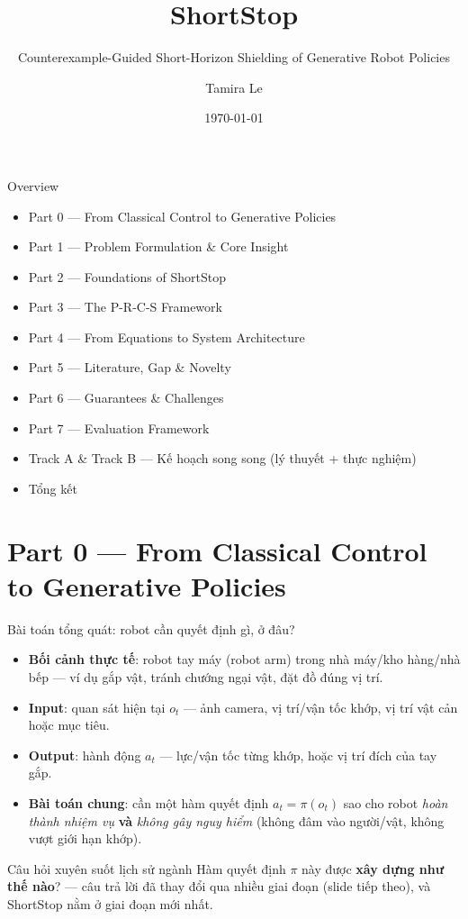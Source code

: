 \documentclass[aspectratio=169]{beamer}
\title{ShortStop}
\subtitle{Counterexample-Guided Short-Horizon Shielding of Generative Robot Policies}
\author{Tamira Le}
\date{\today}
\begin{document}
\maketitle

\begin{frame}[t,shrink=8]{Overview}
\begin{itemize}
    \item Part 0 --- From Classical Control to Generative Policies
    \item Part 1 --- Problem Formulation \& Core Insight
    \item Part 2 --- Foundations of ShortStop
    \item Part 3 --- The P-R-C-S Framework
    \item Part 4 --- From Equations to System Architecture
    \item Part 5 --- Literature, Gap \& Novelty
    \item Part 6 --- Guarantees \& Challenges
    \item Part 7 --- Evaluation Framework
    \item Track A \& Track B --- Kế hoạch song song (lý thuyết + thực nghiệm)
    \item Tổng kết
\end{itemize}
\end{frame}

\section{Part 0 --- From Classical Control to Generative Policies}

\begin{frame}[t,shrink=8]{Bài toán tổng quát: robot cần quyết định gì, ở đâu?}
\begin{itemize}
    \item \textbf{Bối cảnh thực tế}: robot tay máy (robot arm) trong nhà máy/kho hàng/nhà bếp --- ví dụ gắp vật, tránh chướng ngại vật, đặt đồ đúng vị trí.
    \item \textbf{Input}: quan sát hiện tại $o_t$ --- ảnh camera, vị trí/vận tốc khớp, vị trí vật cản hoặc mục tiêu.
    \item \textbf{Output}: hành động $a_t$ --- lực/vận tốc từng khớp, hoặc vị trí đích của tay gắp.
    \item \textbf{Bài toán chung}: cần một hàm quyết định $a_t = \pi(o_t)$ sao cho robot \emph{hoàn thành nhiệm vụ} \textbf{và} \emph{không gây nguy hiểm} (không đâm vào người/vật, không vượt giới hạn khớp).
\end{itemize}
\begin{alertblock}{Câu hỏi xuyên suốt lịch sử ngành}
Hàm quyết định $\pi$ này được \textbf{xây dựng như thế nào}? --- câu trả lời đã thay đổi qua nhiều giai đoạn (slide tiếp theo), và ShortStop nằm ở giai đoạn mới nhất.
\end{alertblock}
\end{frame}
\end{document}
